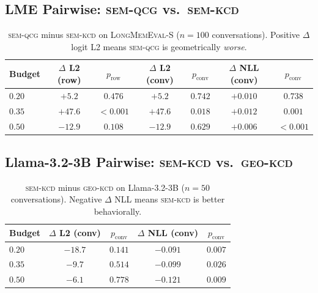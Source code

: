 \documentclass[11pt]{article}
\newcommand{\semqcg}{\textsc{sem-qcg}}
\newcommand{\geokcd}{\textsc{geo-kcd}}
\newcommand{\semkcd}{\textsc{sem-kcd}}
\newcommand{\lme}{\textsc{LongMemEval-S}}
\begin{document}
\subsection{LME Pairwise: \semqcg{} vs.\ \semkcd{}}
\begin{table}[h]
\centering
\caption{\semqcg{} minus \semkcd{} on \lme{} ($n{=}100$ conversations).
Positive $\Delta$ logit L2 means \semqcg{} is geometrically \emph{worse}.}
\label{tab:lme_pairwise}
\setlength{\tabcolsep}{4pt}
\begin{tabular}{lcccccc}
\toprule
Budget & $\Delta$ L2 (row) & $p_\text{row}$ & $\Delta$ L2 (conv) & $p_\text{conv}$ & $\Delta$ NLL (conv) & $p_\text{conv}$ \\
\midrule
$0.20$ & $+5.2$  & $0.476$ & $+5.2$  & $0.742$ & $+0.010$ & $0.738$ \\
$0.35$ & $+47.6$ & ${<}0.001$ & $+47.6$ & $0.018$ & $+0.012$ & $0.001$ \\
$0.50$ & $-12.9$ & $0.108$ & $-12.9$ & $0.629$ & $+0.006$ & ${<}0.001$ \\
\bottomrule
\end{tabular}
\end{table}

\subsection{Llama-3.2-3B Pairwise: \semkcd{} vs.\ \geokcd{}}
\begin{table}[h]
\centering
\caption{\semkcd{} minus \geokcd{} on Llama-3.2-3B ($n{=}50$ conversations).
Negative $\Delta$ NLL means \semkcd{} is better behaviorally.}
\label{tab:llama_pairwise}
\setlength{\tabcolsep}{4pt}
\begin{tabular}{lcccc}
\toprule
Budget & $\Delta$ L2 (conv) & $p_\text{conv}$ & $\Delta$ NLL (conv) & $p_\text{conv}$ \\
\midrule
$0.20$ & $-18.7$ & $0.141$ & $-0.091$ & $\mathbf{0.007}$ \\
$0.35$ & $-9.7$  & $0.514$ & $-0.099$ & $\mathbf{0.026}$ \\
$0.50$ & $-6.1$  & $0.778$ & $-0.121$ & $\mathbf{0.009}$ \\
\bottomrule
\end{tabular}
\end{table}
\end{document}
